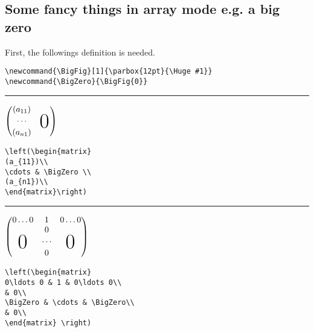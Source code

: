 \subsection{Some fancy things in array mode e.g. a big zero}
\newcommand{\BigFig}[1]{\parbox{12pt}{\Huge #1}}
\newcommand{\BigZero}{\BigFig{0}}
%
First, the followings definition is needed.
%
\begin{verbatim}
\newcommand{\BigFig}[1]{\parbox{12pt}{\Huge #1}}
\newcommand{\BigZero}{\BigFig{0}}
\end{verbatim}
%
%
\begin{center}{\rule{10cm}{0.5pt}}\end{center}
%
$ \left(\begin{matrix}
(a_{11})\\
\cdots & \BigZero \\
(a_{n1})\\
\end{matrix}\right) $\par
%
\begin{verbatim}
\left(\begin{matrix}
(a_{11})\\
\cdots & \BigZero \\
(a_{n1})\\
\end{matrix}\right)
\end{verbatim}
%
%
\begin{center}{\rule{10cm}{0.5pt}}\end{center}
%
$ \left(\begin{matrix}
0\ldots 0 & 1 & 0\ldots 0\\
& 0\\
\BigZero & \cdots & \BigZero\\
& 0\\
\end{matrix} \right) $
%
%
\begin{verbatim}
\left(\begin{matrix}
0\ldots 0 & 1 & 0\ldots 0\\
& 0\\
\BigZero & \cdots & \BigZero\\
& 0\\
\end{matrix} \right)
\end{verbatim}
